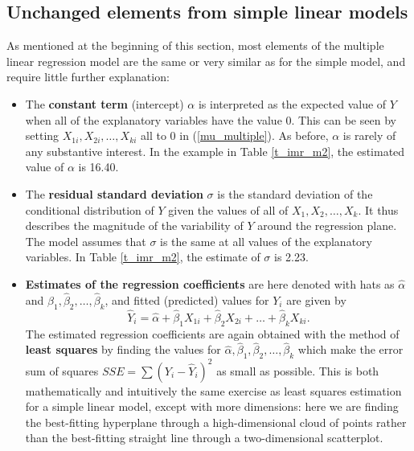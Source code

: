 \subsection{Unchanged elements from simple linear models}
\label{ss_regression_multiple_unchanged}

As mentioned at the beginning of this section, most elements of
the multiple linear regression model are the same or very similar as for
the simple model, and require little further explanation:
\begin{itemize}
\item
The \textbf{constant term} (intercept) $\alpha$ is interpreted as the
expected value of $Y$ when all of the explanatory variables have the
value 0. This can be seen by setting $X_{1i}, X_{2i}, \dots, X_{ki}$ all
to 0 in (\ref{mu_multiple}). As before, $\alpha$ is rarely of any
substantive interest. In the example in Table \ref{t_imr_m2}, the
estimated value of $\alpha$ is 16.40.
\item
The \textbf{residual standard deviation} $\sigma$ is the standard
deviation of the conditional distribution of $Y$ given the values of all of
$X_{1}, X_{2}, \dots, X_{k}$. It thus describes the magnitude of the
variability of $Y$ around the regression plane. The model assumes that
$\sigma$ is the same at all values of the explanatory variables.
In Table \ref{t_imr_m2}, the estimate of $\sigma$ is 2.23.
\item
\textbf{Estimates of the regression coefficients} are here denoted with
hats as $\hat{\alpha}$ and $\hat{\beta}_{1}, \hat{\beta}_{2}, \dots,
\hat{\beta}_{k}$, and fitted (predicted) values for $Y_{i}$ are given by
\begin{equation}
\hat{Y}_{i}=\hat{\alpha}+\hat{\beta}_{1}X_{1i}+\hat{\beta}_{2}X_{2i}+\dots+
\hat{\beta}_{k}X_{ki}.
\label{Yhat}
\end{equation}
The estimated regression coefficients are again obtained with the method of
\textbf{least squares} by finding the values for $\hat{\alpha},
\hat{\beta}_{1}, \hat{\beta}_{2}, \dots, \hat{\beta}_{k}$ which make the
error sum of squares $SSE=\sum (Y_{i}-\hat{Y}_{i})^{2}$ as small as
possible. This is both mathematically and intuitively the same exercise
as least squares estimation for a simple linear model, except with more
dimensions: here we are finding the best-fitting hyperplane through a
high-dimensional cloud of points rather than the best-fitting straight
line through a two-dimensional scatterplot.


\end{itemize}

